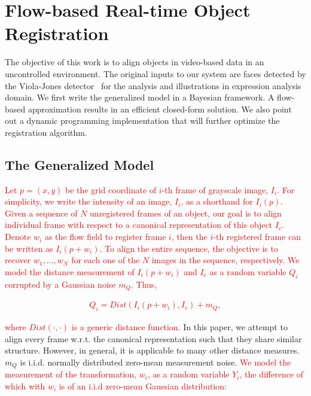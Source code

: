 \documentclass[10pt,journal]{IEEEtran}
\newcommand{\Songfan}[1]{\textcolor{red}{#1}}
\begin{document}
\section{\label{sec:approach}Flow-based Real-time Object Registration}

The objective of this work is to align objects in video-based data in an uncontrolled environment. The original inputs to our system are faces detected by the Viola-Jones detector~\cite{Viola_IJCV04} for the analysis and illustrations in expression analysis domain. We first write the generalized model in a Bayesian framework. A flow-based approximation results in an efficient closed-form solution. We also point out a dynamic programming implementation that will further optimize the registration algorithm.

\subsection{\label{sec:model}The Generalized Model}

\Songfan{Let $p=(x,y)$ be the grid coordinate of $i$-th frame of grayscale image, $I_i$. For simplicity, we write the intensity of an image, $I_i$, as a shorthand for $I_i(p)$. Given a sequence of $N$ unregistered frames of an object, our goal is to align individual frame with respect to a canonical representation of this object $I_c$. Denote $w_i$ as the flow field to register frame $i$, then the $i$-th registered frame can be written as $I_i(p+w_i)$. To align the entire sequence, the objective is to recover $w_1,\ldots,w_N$ for each one of the $N$ images in the sequence, respectively.  We model the distance measurement of $I_i(p+w_i)$ and $I_c$ as a random variable $Q_i$ corrupted by a Gaussian noise $m_Q$. Thus,}

\Songfan{
\begin{align}
\label{model:measurement}
Q_i=Dist(I_i(p+w_i),I_c)+m_Q,
\end{align}
}

\noindent \Songfan{where $Dist(\cdot,\cdot)$ is a generic distance function.} In this paper, we attempt to align every frame w.r.t. the canonical representation such that they share similar structure. However, in general, it is applicable to many other distance measures. $m_Q$ is i.i.d. normally distributed zero-mean measurement noise. \Songfan{We model the measurement of the transformation, $w_i$, as a random variable $Y_i$, the difference of which with $w_i$ is of an i.i.d zero-mean Gaussian distribution: }
\end{document}
